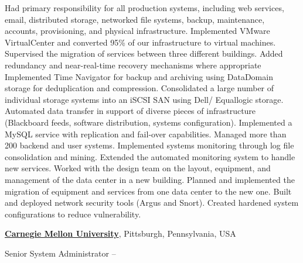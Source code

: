 \documentclass[letterpaper,10pt,oneside]{article}
\begin{document}
\begin{body}
\begin{detail}
\BulletItem
Had primary responsibility for all production systems, including web services, email, distributed storage, networked file systems, backup, maintenance, accounts, provisioning, and physical infrastructure.
\BulletItem
Implemented VMware VirtualCenter and converted 95\% of our infrastructure to virtual machines.
\BulletItem
Supervised the migration of services between three different buildings.
\BulletItem
Added redundancy and near-real-time recovery mechanisms where appropriate
\BulletItem
Implemented Time Navigator for backup and archiving using DataDomain storage for deduplication and compression.
\BulletItem
Consolidated a large number of individual storage systems into an iSCSI SAN using Dell/ Equallogic storage.
\BulletItem
Automated data transfer in support of diverse pieces of infrastructure (Blackboard feeds, software distribution, systems configuration).
\BulletItem
Implemented a MySQL service with replication and fail-over capabilities.
\BulletItem
Managed more than 200 backend and user systems.
\BulletItem
Implemented systems monitoring through log file consolidation and mining. Extended the automated monitoring system to handle new services.
\BulletItem
Worked with the design team on the layout, equipment, and management of the data center in a new building.
\BulletItem
Planned and implemented the migration of equipment and services from one data center to the new one.
\BulletItem
Built and deployed network security tools (Argus and Snort). Created hardened system configurations to reduce vulnerability.

\end{detail}
\EntryGap

\href{http://www.cmu.edu/}
{\textbf{Carnegie Mellon University}},
Pittsburgh, Pennsylvania, USA
\par
Senior System Administrator
\hfill
{} -- 


\end{body}
\end{document}
